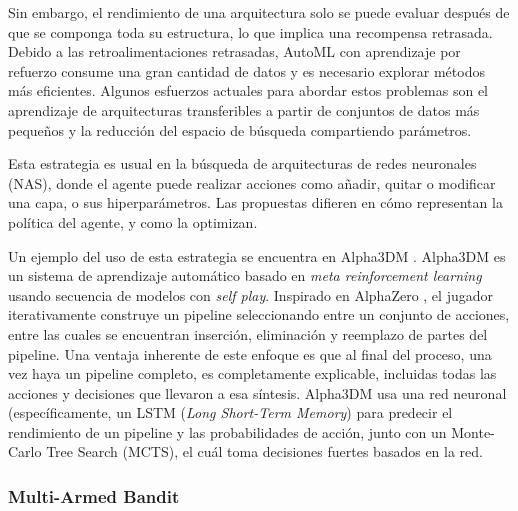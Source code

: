 Sin embargo, el rendimiento de una arquitectura solo se puede evaluar después de que se componga toda su estructura, lo que implica una recompensa retrasada. Debido a las retroalimentaciones retrasadas, AutoML con aprendizaje por refuerzo consume una gran cantidad de datos y es necesario explorar métodos más eficientes. Algunos esfuerzos actuales para abordar estos problemas son el aprendizaje de arquitecturas transferibles a partir de conjuntos de datos más pequeños y la reducción del espacio de búsqueda compartiendo parámetros.

Esta estrategia es usual en la búsqueda de arquitecturas de redes neuronales (NAS), donde el agente puede realizar acciones como añadir, quitar o modificar una capa, o sus hiperparámetros. Las propuestas difieren en cómo representan la política del agente, y como la optimizan.

Un ejemplo del uso de esta estrategia se encuentra en Alpha3DM \cite{drori2018alphad3m}. Alpha3DM es un sistema de aprendizaje automático basado en \textit{meta reinforcement learning} usando secuencia de modelos con \textit{self play}. Inspirado en AlphaZero \cite{alphazero}, el jugador iterativamente construye un pipeline seleccionando entre un conjunto de acciones, entre las cuales se encuentran inserción, eliminación y reemplazo de partes del pipeline. Una ventaja inherente de este enfoque es que al final del proceso, una vez haya un pipeline completo, es completamente explicable, incluidas todas las acciones y decisiones que llevaron a esa síntesis. Alpha3DM usa una red neuronal (específicamente, un LSTM (\textit{Long Short-Term Memory})  para predecir el rendimiento de un pipeline y las probabilidades de acción, junto con un Monte-Carlo Tree Search (MCTS), el cuál toma decisiones fuertes basados en la red.

\subsubsection{Multi-Armed Bandit}



